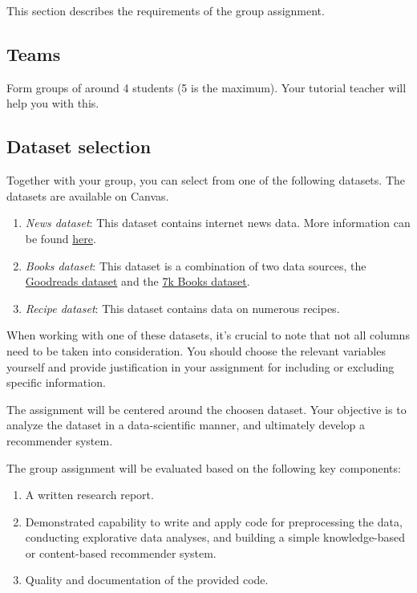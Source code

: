 This section describes the requirements of the group assignment. 

\subsection*{Teams}

Form groups of around 4 students (5 is the maximum). Your tutorial teacher will help you with this.

\subsection*{Dataset selection}
Together with your group, you can select from one of the following datasets. The datasets are available on Canvas. 

\begin{enumerate}
	\item \emph{News dataset}: This dataset contains internet news data. More information can be found \href{https://www.kaggle.com/datasets/szymonjanowski/internet-articles-data-with-users-engagement?select=articles_data.csv}{here}.
 	\item \emph{Books dataset}: This dataset is a combination of two data sources, the \href{https://www.kaggle.com/datasets/jealousleopard/goodreadsbooks?resource=download}{Goodreads dataset} and the \href{https://www.kaggle.com/datasets/dylanjcastillo/7k-books-with-metadata}{7k Books dataset}.
	\item \emph{Recipe dataset}: This dataset contains data on numerous recipes. 
\end{enumerate}

When working with one of these datasets, it's crucial to note that not all columns need to be taken into consideration. You should choose the relevant variables yourself and provide justification in your assignment for including or excluding specific information.

The assignment will be centered around the choosen dataset. Your objective is to analyze the dataset in a data-scientific manner, and ultimately develop a recommender system.

The group assignment will be evaluated based on the following key components:

\begin{enumerate}
\item A written research report.
\item Demonstrated capability to write and apply code for preprocessing the data, conducting explorative data analyses, and building a simple knowledge-based or content-based recommender system.
\item Quality and documentation of the provided code.
\end{enumerate}


